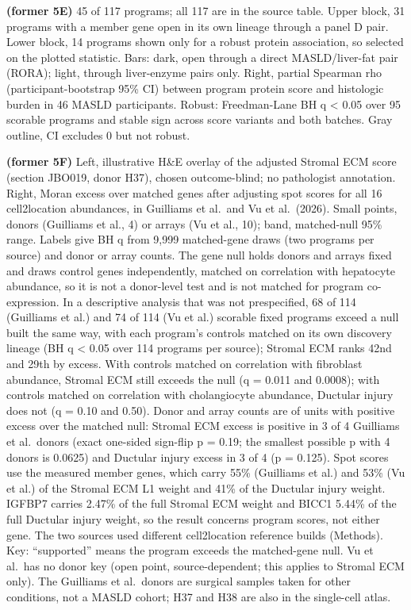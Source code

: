 \textbf{(former 5E)} 45 of 117 programs; all 117 are in the source table. Upper block, 31 programs with a member gene open in its own lineage through a panel D pair. Lower block, 14 programs shown only for a robust protein association, so selected on the plotted statistic. Bars: dark, open through a direct MASLD/liver-fat pair (RORA); light, through liver-enzyme pairs only. Right, partial Spearman rho (participant-bootstrap 95\% CI) between program protein score and histologic burden in 46 MASLD participants. Robust: Freedman-Lane BH q \textless{} 0.05 over 95 scorable programs and stable sign across score variants and both batches. Gray outline, CI excludes 0 but not robust.

\textbf{(former 5F)} Left, illustrative H\&E overlay of the adjusted Stromal ECM score (section JBO019, donor H37), chosen outcome-blind; no pathologist annotation. Right, Moran excess over matched genes after adjusting spot scores for all 16 cell2location abundances, in Guilliams et al.~and Vu et al.~(2026). Small points, donors (Guilliams et al., 4) or arrays (Vu et al., 10); band, matched-null 95\% range. Labels give BH q from 9,999 matched-gene draws (two programs per source) and donor or array counts. The gene null holds donors and arrays fixed and draws control genes independently, matched on correlation with hepatocyte abundance, so it is not a donor-level test and is not matched for program co-expression. In a descriptive analysis that was not prespecified, 68 of 114 (Guilliams et al.) and 74 of 114 (Vu et al.) scorable fixed programs exceed a null built the same way, with each program's controls matched on its own discovery lineage (BH q \textless{} 0.05 over 114 programs per source); Stromal ECM ranks 42nd and 29th by excess. With controls matched on correlation with fibroblast abundance, Stromal ECM still exceeds the null (q = 0.011 and 0.0008); with controls matched on correlation with cholangiocyte abundance, Ductular injury does not (q = 0.10 and 0.50). Donor and array counts are of units with positive excess over the matched null: Stromal ECM excess is positive in 3 of 4 Guilliams et al.~donors (exact one-sided sign-flip p = 0.19; the smallest possible p with 4 donors is 0.0625) and Ductular injury excess in 3 of 4 (p = 0.125). Spot scores use the measured member genes, which carry 55\% (Guilliams et al.) and 53\% (Vu et al.) of the Stromal ECM L1 weight and 41\% of the Ductular injury weight. IGFBP7 carries 2.47\% of the full Stromal ECM weight and BICC1 5.44\% of the full Ductular injury weight, so the result concerns program scores, not either gene. The two sources used different cell2location reference builds (Methods). Key: ``supported'' means the program exceeds the matched-gene null. Vu et al.~has no donor key (open point, source-dependent; this applies to Stromal ECM only). The Guilliams et al.~donors are surgical samples taken for other conditions, not a MASLD cohort; H37 and H38 are also in the single-cell atlas.

